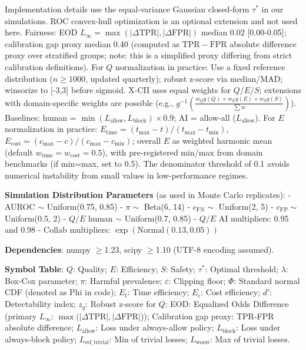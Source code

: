 \documentclass{article}
\begin{document}
Implementation details use the equal-variance Gaussian closed-form $\tau^*$ in our simulations. ROC convex-hull optimization is an optional extension and not used here. Fairness: EOD $L_{\infty} = \max(|\Delta \mathrm{TPR}|, |\Delta \mathrm{FPR}|)$ median 0.02 [0.00-0.05]; calibration gap proxy median 0.40 (computed as $\mathrm{TPR} - \mathrm{FPR}$ absolute difference proxy over stratified groups; note: this is a simplified proxy differing from strict calibration definitions). For $Q$ normalization in practice: Use a fixed reference distribution ($n \ge 1000$, updated quarterly); robust z-score via median/MAD; winsorize to [-3,3] before sigmoid. X-CII uses equal weights for $Q/E/S$; extensions with domain-specific weights are possible (e.g., $g^{-1}\left( \frac{w_Q g(Q) + w_E g(E) + w_S g(S)}{\sum w} \right)$). Baselines: human = $\min(L_{\mathrm{allow}}, L_{\mathrm{block}})\times0.9$; AI = allow-all ($L_{\mathrm{allow}}$). For $E$ normalization in practice: $E_{\mathrm{time}} = (t_{\mathrm{max}} - t)/(t_{\mathrm{max}} - t_{\mathrm{min}})$, $E_{\mathrm{cost}} = (c_{\mathrm{max}} - c)/(c_{\mathrm{max}} - c_{\mathrm{min}})$; overall $E$ as weighted harmonic mean (default $w_{\mathrm{time}} = w_{\mathrm{cost}} = 0.5$), with pre-registered min/max from domain benchmarks (if min=max, set to 0.5). The denominator threshold of 0.1 avoids numerical instability from small values in low-performance regimes.

\textbf{Simulation Distribution Parameters} (as used in Monte Carlo replicates):  
- AUROC $\sim$ Uniform(0.75, 0.85)  
- $\pi \sim$ Beta(6, 14)  
- $c_{\mathrm{FN}} \sim$ Uniform(2, 5)  
- $c_{\mathrm{FP}} \sim$ Uniform(0.5, 2)  
- $Q/E$ human $\sim$ Uniform(0.7, 0.85)  
- $Q/E$ AI multipliers: 0.95 and 0.98  
- Collab multipliers: $\exp(\mathrm{Normal}(0.13, 0.05))$  

\textbf{Dependencies}: numpy $\ge$1.23, scipy $\ge$1.10 (UTF-8 encoding assumed).  

\textbf{Symbol Table}: $Q$: Quality; $E$: Efficiency; $S$: Safety; $\tau^*$: Optimal threshold; $\lambda$: Box-Cox parameter; $\pi$: Harmful prevalence; $\varepsilon$: Clipping floor; $\Phi$: Standard normal CDF (denoted as Phi in code); $E_t$: Time efficiency; $E_c$: Cost efficiency; $d'$: Detectability index; $z_q$: Robust z-score for $Q$; EOD: Equalized Odds Difference (primary $L_{\infty}$: $\max(|\Delta \mathrm{TPR}|, |\Delta \mathrm{FPR}|$)); Calibration gap proxy: TPR-FPR absolute difference; $L_{\mathrm{allow}}$: Loss under always-allow policy; $L_{\mathrm{block}}$: Loss under always-block policy; $L_{\mathrm{ref\_trivial}}$: Min of trivial losses; $L_{\mathrm{worst}}$: Max of trivial losses.  
\end{document}
